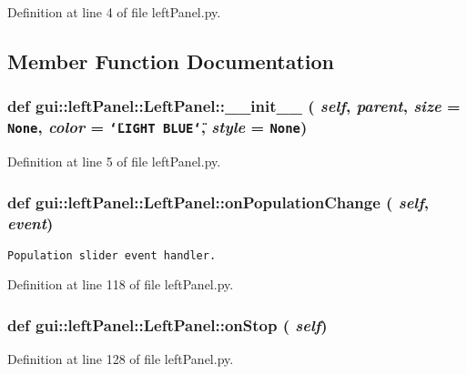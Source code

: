 Definition at line 4 of file leftPanel.py.

\subsection{Member Function Documentation}
\subsubsection{\setlength{\rightskip}{0pt plus 5cm}def gui::leftPanel::LeftPanel::\_\-\_\-init\_\-\_\- ( {\em self},  {\em parent},  {\em size} = {\tt None},  {\em color} = {\tt \char`\"{}LIGHT~BLUE\char`\"{}},  {\em style} = {\tt None})}\label{classgui_1_1leftPanel_1_1LeftPanel_fc103bba8e064b25974f3b8a68c7f8f6}




Definition at line 5 of file leftPanel.py.
\subsubsection{\setlength{\rightskip}{0pt plus 5cm}def gui::leftPanel::LeftPanel::onPopulationChange ( {\em self},  {\em event})}\label{classgui_1_1leftPanel_1_1LeftPanel_00c462afdd9ee9c27ed41ee6804bad84}




\footnotesize\begin{verbatim}
Population slider event handler.
\end{verbatim}
\normalsize
 

Definition at line 118 of file leftPanel.py.
\subsubsection{\setlength{\rightskip}{0pt plus 5cm}def gui::leftPanel::LeftPanel::onStop ( {\em self})}\label{classgui_1_1leftPanel_1_1LeftPanel_dcc8656de4327385c4351b2442d8bb96}




Definition at line 128 of file leftPanel.py.

